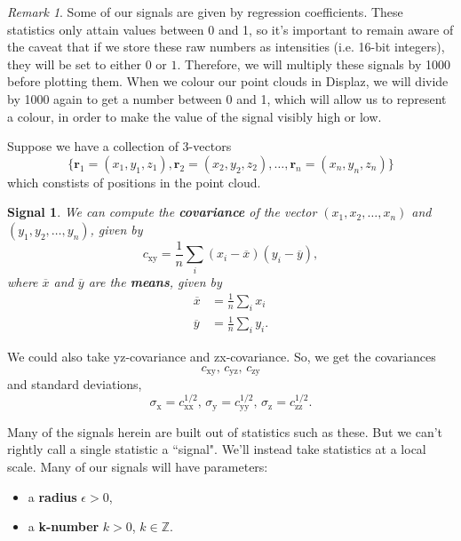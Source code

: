 \documentclass[a4paper,11pt,twoside]{article}
\newtheorem*{signals}{Signal}
\theoremstyle{definition}
\theoremstyle{remark}
\newtheorem{rmk}[thm]{Remark}
\newenvironment{sigs}
   {\colorlet{shadecolor}{green!50}\begin{shaded}\begin{signals}}
   {\end{signals}\end{shaded}}
\begin{document}
\begin{rmk}Some of our signals are given by regression coefficients. These statistics only attain values between 0 and 1, so it's important to remain aware of the caveat that if we store these raw numbers as intensities (i.e. 16-bit integers), they will be set to either $0$ or $1$. Therefore, we will multiply these signals by 1000 before plotting them. When we colour our point clouds in Displaz, we will divide by 1000 again to get a number between 0 and 1, which will allow us to represent a colour, in order to make the value of the signal visibly high or low. 
\end{rmk}
Suppose we have a collection of 3-vectors
\begin{displaymath}
\{\textbf{r}_1=(x_1,y_1,z_1),\textbf{r}_2=(x_2,y_2,z_2),\dots,\textbf{r}_n=(x_n,y_n,z_n)\}
\end{displaymath}
which constists of positions in the point cloud. 
\begin{sigs}
We can compute the \textbf{covariance} of the vector $(x_1,x_2,\dots,x_n)$ and $(y_1,y_2,\dots,y_n)$, given by
\begin{displaymath}
c_\mathrm{xy}=\frac{1}{n}\sum_i(x_i-\overline x)(y_i-\overline y),
\end{displaymath}
where $\overline x$ and $\overline y$ are the \textbf{means}, given by
\begin{align*}
\overline x&=\frac{1}{n}\sum_i x_i
\\
\overline y&=\frac{1}{n}\sum_i y_i.
\end{align*}
\end{sigs}
We could also take yz-covariance and zx-covariance. So, we get the covariances
\begin{displaymath}
c_\mathrm{xy}\text{, }c_\mathrm{yz}\text{, }c_\mathrm{zy}
\end{displaymath}
and standard deviations, 
\begin{displaymath}
\sigma_\mathrm{x}=c_\mathrm{xx}^{1/2}\text{, }\sigma_\mathrm{y}=c_\mathrm{yy}^{1/2}\text{, }\sigma_\mathrm{z}=c_\mathrm{zz}^{1/2}.
\end{displaymath}

Many of the signals herein are built out of statistics such as these. But we can't rightly call a single statistic a ``signal". We'll instead take statistics at a local scale. Many of our signals will have parameters:
\begin{itemize}
\item a \textbf{radius} $\epsilon>0$,
\item a \textbf{k-number} $k>0$, $k\in\mathbb{Z}$.
\end{itemize}
\end{document}
